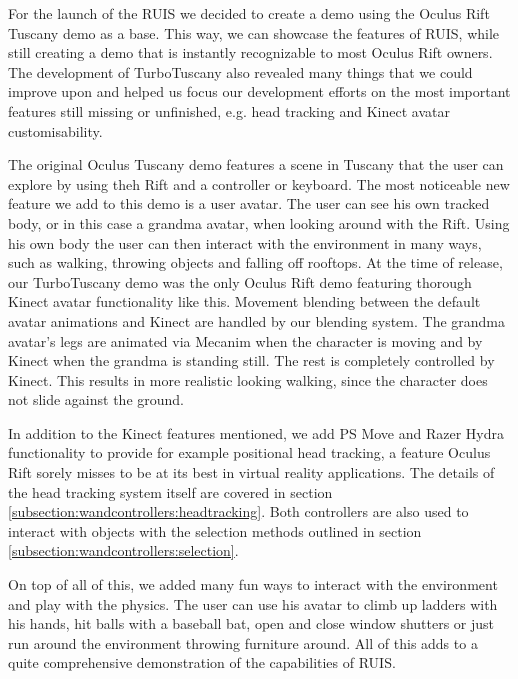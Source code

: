 \documentclass[12pt,a4paper,oneside,pdftex]{report}
\begin{document}
For the launch of the RUIS we decided to create a demo using the Oculus Rift Tuscany demo as a base. This way, we can showcase the features of RUIS, while still creating a demo that is instantly recognizable to most Oculus Rift owners. The development of TurboTuscany also revealed many things that we could improve upon and helped us focus our development efforts on the most important features still missing or unfinished, e.g. head tracking and Kinect avatar customisability.

The original Oculus Tuscany demo features a scene in Tuscany that the user can explore by using theh Rift and a controller or keyboard. The most noticeable new feature we add to this demo is a user avatar. The user can see his own tracked body, or in this case a grandma avatar, when looking around with the Rift. Using his own body the user can then interact with the environment in many ways, such as walking, throwing objects and falling off rooftops. At the time of release, our TurboTuscany demo was the only Oculus Rift demo featuring thorough Kinect avatar functionality like this. Movement blending between the default avatar animations and Kinect are handled by our blending system. The grandma avatar's legs are animated via Mecanim when the character is moving and by Kinect when the grandma is standing still. The rest is completely controlled by Kinect. This results in more realistic looking walking, since the character does not slide against the ground.

In addition to the Kinect features mentioned, we add PS Move and Razer Hydra functionality to provide for example positional head tracking, a feature Oculus Rift sorely misses to be at its best in virtual reality applications. The details of the head tracking system itself are covered in section \ref{subsection:wandcontrollers:headtracking}. Both controllers are also used to interact with objects with the selection methods outlined in section \ref{subsection:wandcontrollers:selection}.

On top of all of this, we added many fun ways to interact with the environment and play with the physics. The user can use his avatar to climb up ladders with his hands, hit balls with a baseball bat, open and close window shutters or just run around the environment throwing furniture around. All of this adds to a quite comprehensive demonstration of the capabilities of RUIS.


\end{document}

